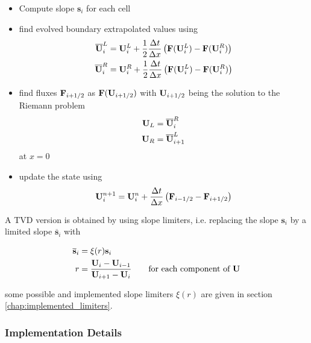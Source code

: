 \begin{itemize}
	\item 	Compute slope $\mathbf{s}_i$ for each cell
	\item 	find evolved boundary extrapolated values using
			\begin{align*}
				\overline{\mathbf{U}}_i^L &= \mathbf{U}_i^L + \frac{1}{2} \frac{\Delta t}{\Delta x} \left( \mathbf{F}(\mathbf{U}_i^L) - \mathbf{F}(\mathbf{U}_i^R) \right)\\
				\overline{\mathbf{U}}_i^R &= \mathbf{U}_i^R + \frac{1}{2} \frac{\Delta t}{\Delta x} \left( \mathbf{F}(\mathbf{U}_i^L) - \mathbf{F}(\mathbf{U}_i^R) \right)
			\end{align*}
	\item 	find fluxes $\mathbf{F}_{i + 1/2}$ as $\mathbf{F}(\mathbf{U}_{i+1/2})$ with $\mathbf{U}_{i+1/2}$ being the solution to the Riemann problem
			\begin{align}
				\mathbf{U}_L &= \overline{\mathbf{U}}_i^R\\
				\mathbf{U}_R &= \overline{\mathbf{U}}_{i+1}^L
			\end{align}
			at $ x = 0$

	\item 	update the state using
			\begin{equation}
				\mathbf{U}_i^{n+1} = \mathbf{U}_i^n + \frac{\Delta t}{\Delta x} \left( \mathbf{F}_{i-1/2} - \mathbf{F}_{i + 1/2} \right)
			\end{equation}
\end{itemize}




A TVD version is obtained by using slope limiters, i.e. replacing the slope $\mathbf{s}_i$ by a limited slope $\overline{\mathbf{s}}_i$ with

\begin{align*}
	\overline{\mathbf{s}}_i &= \xi(r) \mathbf{s}_i \\
	r &= \frac{\mathbf{U}_i - \mathbf{U}_{i-1}}{\mathbf{U}_{i+1} - \mathbf{U}_{i}} \quad\quad \text{for each component of }\mathbf{U}
\end{align*}

some possible and implemented slope limiters $\xi(r)$ are given in section \ref{chap:implemented_limiters}.
















\subsubsection{Implementation Details}




